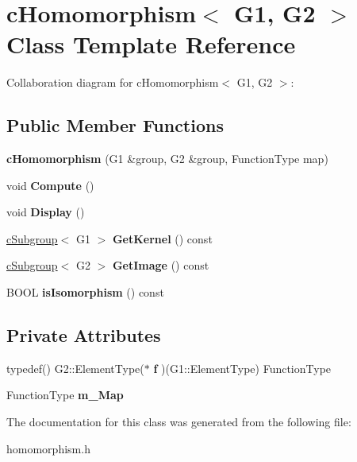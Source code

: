\hypertarget{classcHomomorphism}{\section{c\-Homomorphism$<$ G1, G2 $>$ Class Template Reference}
\label{classcHomomorphism}
}


Collaboration diagram for c\-Homomorphism$<$ G1, G2 $>$\-:
\subsection*{Public Member Functions}
\begin{DoxyCompactItemize}
\item 
\hypertarget{classcHomomorphism_a826f07eaa6c431de9fc8ad236ebb7502}{{\bfseries c\-Homomorphism} (G1 \&group, G2 \&group, Function\-Type map)}\label{classcHomomorphism_a826f07eaa6c431de9fc8ad236ebb7502}

\item 
\hypertarget{classcHomomorphism_a4f6919efcd1c8446207a5150e3f29143}{void {\bfseries Compute} ()}\label{classcHomomorphism_a4f6919efcd1c8446207a5150e3f29143}

\item 
\hypertarget{classcHomomorphism_a0afe7b713cdb3e7628d049011334b539}{void {\bfseries Display} ()}\label{classcHomomorphism_a0afe7b713cdb3e7628d049011334b539}

\item 
\hypertarget{classcHomomorphism_a0f6fe4c7df91a345cd26023cf9b7c29d}{\hyperlink{classcSubgroup}{c\-Subgroup}$<$ G1 $>$ {\bfseries Get\-Kernel} () const }\label{classcHomomorphism_a0f6fe4c7df91a345cd26023cf9b7c29d}

\item 
\hypertarget{classcHomomorphism_ae2a5c5ab1fea57af03dbb926b05c5edc}{\hyperlink{classcSubgroup}{c\-Subgroup}$<$ G2 $>$ {\bfseries Get\-Image} () const }\label{classcHomomorphism_ae2a5c5ab1fea57af03dbb926b05c5edc}

\item 
\hypertarget{classcHomomorphism_ae5514786d9d5f0a185e5465c11075f13}{B\-O\-O\-L {\bfseries is\-Isomorphism} () const }\label{classcHomomorphism_ae5514786d9d5f0a185e5465c11075f13}

\end{DoxyCompactItemize}
\subsection*{Private Attributes}
\begin{DoxyCompactItemize}
\item 
\hypertarget{classcHomomorphism_a8b597c591cbbfb2a6ed415978c95d953}{typedef() G2\-::\-Element\-Type($\ast$ {\bfseries f} )(G1\-::\-Element\-Type) Function\-Type}\label{classcHomomorphism_a8b597c591cbbfb2a6ed415978c95d953}

\item 
\hypertarget{classcHomomorphism_ae6f45d109f0163c4ad74e5c30bcfe12c}{Function\-Type {\bfseries m\-\_\-\-Map}}\label{classcHomomorphism_ae6f45d109f0163c4ad74e5c30bcfe12c}

\end{DoxyCompactItemize}


The documentation for this class was generated from the following file\-:\begin{DoxyCompactItemize}
\item 
homomorphism.\-h\end{DoxyCompactItemize}
